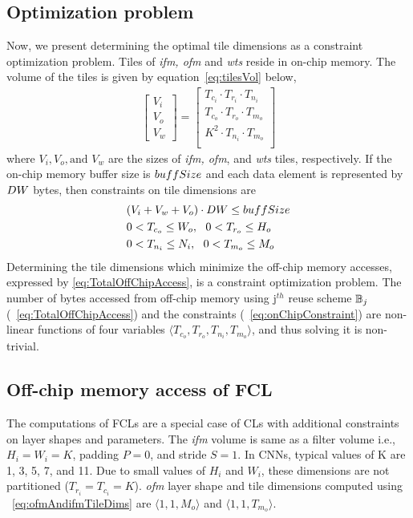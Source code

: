 \subsection{Optimization problem}
Now, we present determining the optimal tile dimensions as a constraint optimization problem. Tiles of \textit{ifm, ofm} and \textit{wts} reside in on-chip memory. The volume of the tiles is given by equation~\eqref{eq:tilesVol} below,
\begin{align}\label{eq:tilesVol}
	\begin{bmatrix}
		V_i \\ V_o \\ V_w
	\end{bmatrix}=
	\begin{bmatrix}
		T_{c_i}\cdot T_{r_i}\cdot T_{n_i}\\
		T_{c_o}\cdot T_{r_o}\cdot T_{m_o}\\
		K^2\cdot T_{n_i}\cdot T_{m_o}\\
	\end{bmatrix}
\end{align}
where $V_i, V_o, \text{and }V_w$ are the sizes of \textit{ifm, ofm}, and \textit{wts} tiles, respectively. If the on-chip memory buffer size is $buffSize$ and each data element is represented by $DW$ bytes, then constraints on tile dimensions are
\begin{align}\label{eq:onChipConstraint}
	\begin{split}
		&(V_i + V_w + V_o)\cdot DW\leq buffSize \\
		&0<T_{c_o}\leq W_o,~\ 0<T_{r_o}\leq H_o\\
		&0<T_{n_i}\leq N_i,~\ 0<T_{m_o}\leq M_o
	\end{split}
\end{align}
Determining the tile dimensions which minimize the off-chip memory accesses, expressed by \eqref{eq:TotalOffChipAccess}, is a constraint optimization problem. The number of bytes accessed from off-chip memory using j$^{th}$ reuse scheme $\mathbb{B}_j$ (~\eqref{eq:TotalOffChipAccess}) and the constraints (~\eqref{eq:onChipConstraint}) are non-linear functions of four variables $\langle T_{c_o},T_{r_o},T_{n_i},T_{m_o}\rangle$, and thus solving it is non-trivial.
\subsection{Off-chip memory access of FCL}\label{sec:AccessFCLData}
The computations of FCLs are a special case of CLs with additional constraints on layer shapes and parameters. The \textit{ifm} volume is same as a filter volume i.e., $H_i{=}W_i{=}K$, padding $P{=}0$, and stride $S{=}1$. In CNNs, typical values of K are 1, 3, 5, 7, and 11. Due to small values of $H_i$ and $W_i$, these dimensions are not partitioned ($T_{r_i}{=}T_{c_i}{=}K$). \textit{ofm} layer shape and tile dimensions computed using ~\eqref{eq:ofmAndifmTileDims} are $\langle 1,1,M_o\rangle$ and $\langle 1,1,T_{m_o}\rangle$.

